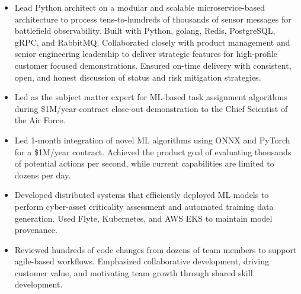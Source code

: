 \begin{itemize}
\item Lead Python architect on a modular and scalable microservice-based architecture to process tens-to-hundreds of thousands of sensor messages for battlefield observability. Built with Python, golang, Redis, PostgreSQL, gRPC, and RabbitMQ. Collaborated closely with product management and senior engineering leadership to deliver strategic features for high-profile customer focused demonstrations. Ensured on-time delivery with consistent, open, and honest discussion of status and risk mitigation strategies.
\item Led as the subject matter expert for ML-based task assignment algorithms during \$1M/year-contract close-out demonstration to the Chief Scientist of the Air Force.
\item Led 1-month integration of novel ML algorithms using ONNX and PyTorch for a \$1M/year contract. Achieved the product goal of evaluating thousands of potential actions per second, while current capabilities are limited to dozens per day.
\item Developed distributed systems that efficiently deployed ML models to perform cyber-asset criticality assessment and automated training data generation. Used Flyte, Kubernetes, and AWS EKS to maintain model provenance.
\item Reviewed hundreds of code changes from dozens of team members to support agile-based workflows. Emphasized collaborative development, driving customer value, and motivating team growth through shared skill development.
\end{itemize}
\sectionsep

